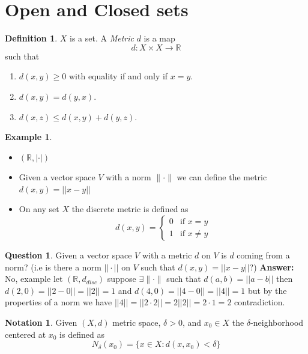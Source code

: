 \documentclass[11pt,openany]{book}
\theoremstyle{plain}
\theoremstyle{definition}
\newtheorem{definition}{Definition}[chapter]
\newtheorem{example}{Example}[chapter]
\newtheorem{question}{Question}[chapter]
\newtheorem{notation}{Notation}[chapter]
\theoremstyle{remark}
\newcommand{\R}{\mathbb{R}}
\newcommand{\cnorm}{\| \cdot \|}
\begin{document}
\section{Open and Closed sets}
\begin{definition}
    $X$ is a set. A \emph{Metric} $d$ is a map\[
    d: X \times X \to \R
    \]
    such that \begin{enumerate}
        \item $d(x,y) \ge 0$ with equality if and only if $x=y$.
        \item $d(x,y) = d(y,x)$.
        \item $d(x,z) \le d(x,y) + d(y,z)$.
    \end{enumerate}
\end{definition}
\begin{example}
    \begin{itemize}
        \item $(\R, |\cdot|)$
        \item Given a vector space $V$ with a norm $\cnorm$ we can define the metric $d(x,y) = ||x-y||$
        \item On any set $X$ the discrete metric is defined as \[
        d(x,y) = \begin{cases}
        0 & \text{if } x = y \\
        1 & \text{if } x \neq y
        \end{cases}
        \]
    \end{itemize}
\end{example}
\begin{question}
    Given a vector space $V$ with a metric $d$ on $V$ is $d$ coming from a norm? (i.e is there a norm $||\cdot||$ on $V$ such that $d(x,y) = ||x-y||$?)
    \textbf{Answer:} No, example let $(\R, d_{disc})$ suppose $\exists \cnorm$ such that $d(a,b) = ||a-b||$ then $d(2,0) = || 2-0|| = ||2|| = 1$ and $d(4,0) = ||4-0|| = ||4|| = 1$ but by the properties of a norm we have $||4|| = ||2\cdot 2|| = 2||2|| = 2\cdot 1 = 2$ contradiction.
\end{question}

\begin{notation}
    Given $(X,d)$ metric space, $ \delta >0$, and $x_0 \in X$ the $\delta$-neighborhood centered at $x_0$ is defined as \[
    N_{\delta}(x_0) = \{x \in X : d(x,x_0) < \delta \}  
    \]
\end{notation}
\end{document}
